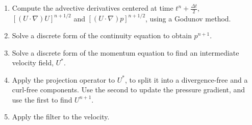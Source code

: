 \documentclass{article}
\begin{document}
\begin{enumerate}
	\item Compute the advective derivatives centered at time $t^n + \frac{\Delta t}{2}$, $\left[ (U \cdot \nabla) U \right]^{n + 1/2}$ and $\left[ (U \cdot \nabla) p \right]^{n + 1/2}$, using a Godunov method.
	\item Solve a discrete form of the continuity equation to obtain $p^{n + 1}$.
	\item Solve a discrete form of the momentum equation to find an intermediate velocity field, $U^*$.
	\item Apply the projection operator to $U^*$, to split it into a divergence-free and a curl-free components. Use the second to update the pressure gradient, and use the first to find $U^{n + 1}$.
	\item Apply the filter to the velocity.
\end{enumerate}



\end{document}
